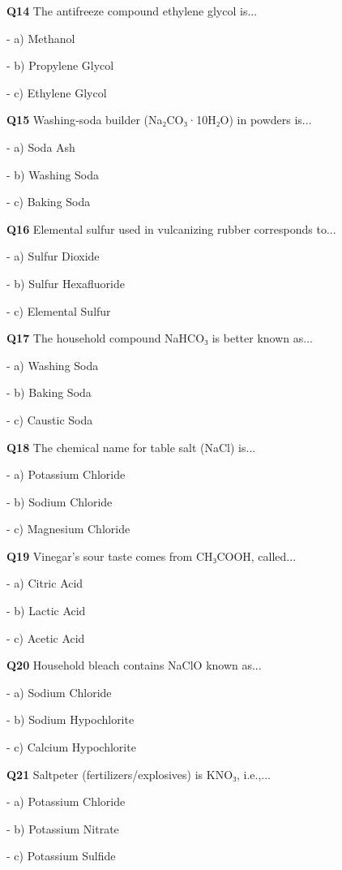 \textbf{Q14} The antifreeze compound ethylene glycol is...\par
\quad - a) Methanol\par
\quad - b) Propylene Glycol\par
\quad - c) Ethylene Glycol\par

\textbf{Q15} Washing‑soda builder (Na₂CO₃·10H₂O) in powders is...\par
\quad - a) Soda Ash\par
\quad - b) Washing Soda\par
\quad - c) Baking Soda\par

\textbf{Q16} Elemental sulfur used in vulcanizing rubber corresponds to...\par
\quad - a) Sulfur Dioxide\par
\quad - b) Sulfur Hexafluoride\par
\quad - c) Elemental Sulfur\par

\textbf{Q17} The household compound NaHCO₃ is better known as...\par
\quad - a) Washing Soda\par
\quad - b) Baking Soda\par
\quad - c) Caustic Soda\par

\textbf{Q18} The chemical name for table salt (NaCl) is...\par
\quad - a) Potassium Chloride\par
\quad - b) Sodium Chloride\par
\quad - c) Magnesium Chloride\par

\textbf{Q19} Vinegar's sour taste comes from CH₃COOH, called...\par
\quad - a) Citric Acid\par
\quad - b) Lactic Acid\par
\quad - c) Acetic Acid\par

\textbf{Q20} Household bleach contains NaClO known as...\par
\quad - a) Sodium Chloride\par
\quad - b) Sodium Hypochlorite\par
\quad - c) Calcium Hypochlorite\par

\textbf{Q21} Saltpeter (fertilizers/explosives) is KNO₃, i.e.,...\par
\quad - a) Potassium Chloride\par
\quad - b) Potassium Nitrate\par
\quad - c) Potassium Sulfide\par

